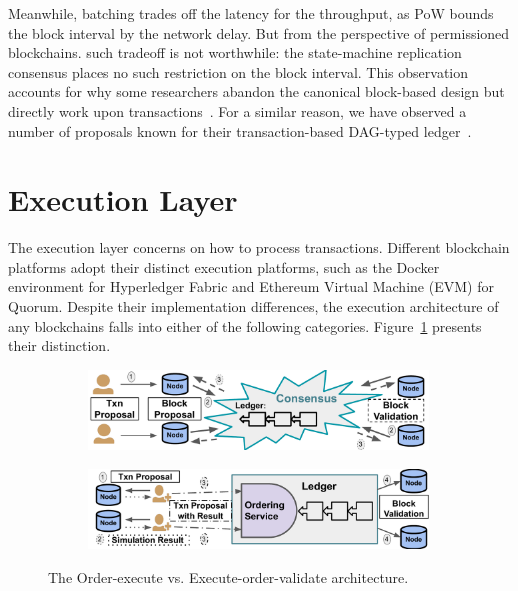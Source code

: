 Meanwhile, batching trades off the latency for the throughput, as PoW bounds the block interval by the network delay. 
But from the perspective of permissioned blockchains. such tradeoff is not worthwhile: the state-machine replication consensus places no such restriction on the block interval. 
This observation accounts for why some researchers abandon the canonical block-based design but directly work upon transactions~\cite{istvan2018streamchain}. 
For a similar reason, we have observed a number of proposals known for their transaction-based DAG-typed ledger~\cite{lemahieu2018nano,churyumov2016byteball,divya2018iota}. 

\section{Execution Layer}
The execution layer concerns on how to process transactions. 
Different blockchain platforms adopt their distinct execution platforms, such as the Docker environment for Hyperledger Fabric and Ethereum Virtual Machine (EVM) for Quorum. 
Despite their implementation differences, the execution architecture of any blockchains falls into either of the following categories. Figure~\ref{diagram:literature:execution} presents their distinction. 

\begin{figure}
    \centering
    \begin{subfigure}{0.8\textwidth}
      \includegraphics[width=0.99\textwidth]{diagram/literature/ox_arch.pdf}
    \end{subfigure}
    \begin{subfigure}{0.8\textwidth}
      \includegraphics[width=0.99\textwidth]{diagram/literature/eov_arch.pdf}
    \end{subfigure}
    \caption{The Order-execute vs. Execute-order-validate architecture. }
    \label{diagram:literature:execution}
\end{figure}

